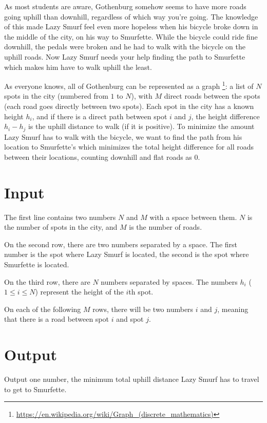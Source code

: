 
As most students are aware, Gothenburg somehow seems to have more roads going uphill than downhill,
regardless of which way you're going. The knowledge of this made Lazy Smurf feel even more hopeless
when his bicycle broke down in the middle of the city, on his way to Smurfette. While the bicycle could ride
fine downhill, the pedals were broken and he had to walk with the bicycle on the uphill roads. Now Lazy Smurf needs
your help finding the path to Smurfette which makes him have to walk
uphill the least.

As everyone knows, all of Gothenburg can be represented as a graph
\footnote{\url{https://en.wikipedia.org/wiki/Graph_(discrete_mathematics)}}:
a list of $N$ spots in the city (numbered from $1$ to $N$), with $M$ direct roads
between the spots (each road goes directly between two spots). Each spot in the city has a known
height $h_i$, and if there is a direct path between spot $i$ and $j$, the height difference $h_i-h_j$
is the uphill distance to walk (if it is positive). To minimize the amount Lazy Smurf has to walk
with the bicycle, we want to find the path from his location to Smurfette's which minimizes the total
height difference for all roads between their locations, counting downhill and flat roads as 0.

\section*{Input}
The first line contains two numbers $N$ and $M$ with a space between them. $N$
is the number of spots in the city, and $M$ is the number of roads.

On the second row, there are two numbers separated by a space. The first number is the spot where
Lazy Smurf is located, the second is the spot where Smurfette is located.

On the third row, there are $N$ numbers separated by spaces. The numbers $h_i$ ($1 \le i \le N$)
represent the height of the $i$th spot.

On each of the following $M$ rows, there will be two numbers $i$ and $j$, meaning that there is a
road between spot $i$ and spot $j$.

\section*{Output}

Output one number, the minimum total uphill distance Lazy Smurf has to
travel to get to Smurfette.

